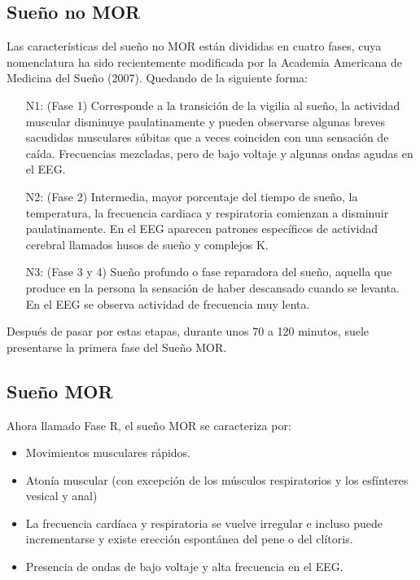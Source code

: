 \documentclass[letterpaper,titlepage,12pt,draft]{report}
\begin{document}
\subsection{Sue\~no no MOR}

Las caracter\'isticas del sue\~no no MOR est\'an divididas en cuatro fases, cuya nomenclatura ha sido recientemente modificada por la Academia Americana de Medicina del Sue\~no (2007). Quedando de la siguiente forma:

\begin{itemize}
\item[N1:] (Fase 1) Corresponde a la transici\'on de la vigilia al sue\~no, la actividad muscular disminuye paulatinamente y pueden observarse algunas breves sacudidas musculares s\'ubitas que a veces coinciden con una sensaci\'on de ca\'ida. 
Frecuencias mezcladas, pero de bajo voltaje y algunas ondas agudas en el EEG.
\item[N2:] (Fase 2) Intermedia, mayor porcentaje del tiempo de sue\~no, la temperatura, la frecuencia cardiaca y respiratoria comienzan a disminuir paulatinamente.
En el EEG aparecen patrones espec\'ificos de actividad cerebral llamados husos de sue\~no y complejos K.
\item[N3:] (Fase 3 y 4) Sue\~no profundo o fase reparadora del sue\~no, aquella que produce en la persona la sensaci\'on de haber descansado cuando se levanta. En el EEG se observa actividad de frecuencia muy lenta\cite{sue}. 
\end{itemize}

Despu\'es de pasar por estas etapas, durante unos 70 a 120 minutos, suele presentarse la primera fase del Sue\~no MOR. 
\subsection{Sue\~no MOR}

Ahora llamado Fase R, el sue\~no MOR se caracteriza por:

\begin{itemize}
\item Movimientos musculares r\'apidos.
\item Aton\'ia muscular (con excepci\'on de los m\'usculos respiratorios y los esf\'interes vesical y anal)
\item La frecuencia card\'iaca y respiratoria se vuelve irregular e incluso puede incrementarse y existe erecci\'on espont\'anea del pene o del cl\'itoris.
\item Presencia de ondas de bajo voltaje y alta frecuencia en el EEG.
\end{itemize}
\end{document}
